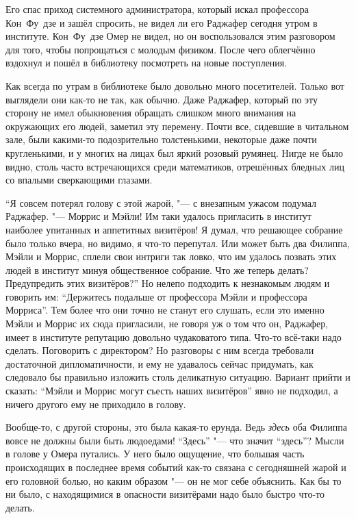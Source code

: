 Его спас приход системного администратора, который искал профессора Кон~Фу~дзе
и зашёл спросить, не видел ли его Раджафер сегодня утром в институте.
Кон~Фу~дзе Омер не видел, но он воспользовался этим разговором для того, чтобы
попрощаться с молодым физиком.
После чего облегчённо вздохнул и пошёл в библиотеку посмотреть на новые
поступления.

Как всегда по утрам в библиотеке было довольно много посетителей.
Только вот выглядели они как-то не так, как обычно.
Даже Раджафер, который по эту сторону не имел обыкновения обращать слишком много
внимания на окружающих его людей, заметил эту перемену.
Почти все, сидевшие в читальном зале, были какими-то подозрительно толстенькими,
некоторые даже почти кругленькими, и у многих на лицах был яркий розовый
румянец.
Нигде не было видно, столь часто встречающихся среди математиков, отрешённых
бледных лиц со впалыми сверкающими глазами.

\enquote{Я совсем потерял голову с этой жарой, "--- с внезапным ужасом подумал
Раджафер.
"--- Моррис и Мэйли!
Им таки удалось пригласить в институт наиболее упитанных и аппетитных визитёров!
Я думал, что решающее собрание было только вчера, но видимо, я что-то перепутал.
Или может быть два Филиппа, Мэйли и Моррис, сплели свои интриги так ловко, что им
удалось позвать этих людей в институт минуя общественное собрание.
Что же теперь делать?
Предупредить этих визитёров?}
Но нелепо подходить к незнакомым людям и говорить им: \enquote{Держитесь подальше
от профессора Мэйли и профессора Морриса}.
Тем более что они точно не станут его слушать, если это именно Мэйли и Моррис
их сюда пригласили, не говоря уж о том что он, Раджафер, имеет в институте
репутацию довольно чудаковатого типа.
Что-то всё-таки надо сделать.
Поговорить с директором?
Но разговоры с ним всегда требовали достаточной дипломатичности, и ему не
удавалось сейчас придумать, как следовало бы правильно изложить столь деликатную
ситуацию.
Вариант прийти и сказать: \enquote{Мэйли и Моррис могут съесть наших визитёров}
явно не подходил, а ничего другого ему не приходило в голову.

Вообще-то, с другой стороны, это была какая-то ерунда.
Ведь \emph{здесь} оба Филиппа вовсе не должны были быть людоедами!
\enquote{Здесь} "--- что значит \enquote{здесь}?
Мысли в голове у Омера путались.
У него было ощущение, что большая часть происходящих в последнее время событий
как-то связана с сегодняшней жарой и его головной болью, но каким образом "---
он не мог себе объяснить.
Как бы то ни было, с находящимися в опасности визитёрами надо было быстро что-то
делать.

